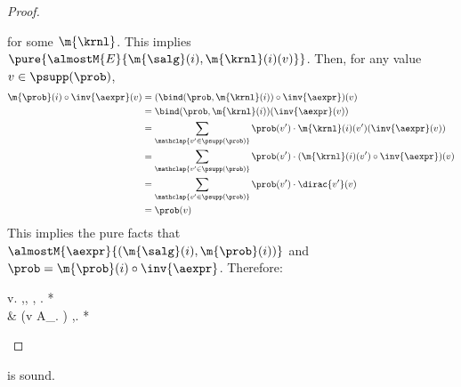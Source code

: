 \documentclass[acmsmall,nonacm,screen,appendix]{acmart}
\begin{document}
\begin{proof}
\begin{casesplit}
for some $\m{\krnl}$.
    This implies
    $\pure{\almostM{E}{\m{\salg}(i), \m{\krnl}(i)(v)}}$.
    Then, for any value $v \in \psupp(\prob)$,
    \begin{align*}
      \m{\prob}(i) \circ \inv{\aexpr}(v)
      &=(\bind(\prob, \m{\krnl}(i) ) \circ \inv{\aexpr})(v)\\
      &=  \bind(\prob, \m{\krnl}(i) )  (\inv{\aexpr}(v)) \\
      &=  \sum_{\mathclap{v'\in\psupp(\prob)}}  \prob(v') \cdot \m{\krnl}(i)(v') (\inv{\aexpr}(v)) \\
      &=  \sum_{\mathclap{v'\in\psupp(\prob)}}  \prob(v') \cdot (\m{\krnl}(i)(v') \circ \inv{\aexpr}) (v) \\
      &=  \sum_{\mathclap{v'\in\psupp(\prob)}}  \prob(v') \cdot \dirac{v'} (v) \\
&=  \prob(v)
    \end{align*}
    This implies the pure facts that
    $ \almostM{\aexpr}{(\m{\salg}(i),\m{\prob}(i))}$ and
    $\prob = \m{\prob}(i) \circ \inv{\aexpr}$.
    Therefore:
    \begin{eqexplain}
      \CC\prob v.  \notag
      \whichproves*
      \E \m{\salg},\m{\prob}, \m{\krnl}, \m{\permap}.
          \Own{\m{\salg},\m{\prob}, \m{\permap}} *
           \notag \\
          & \qquad \qquad  *
          (\forall v \in A_{\prob}.
          \wand
          )
      \whichproves
      \E \m{\salg},\m{\prob}.
        \Own{\m{\salg},\m{\prob}} *
            \ast
       \whichproves
       \qedhere
    \end{eqexplain}
  \end{casesplit}
\end{proof}
 \begin{lemma}
\label{proof:c-assoc}
   is sound.
\end{lemma}
\end{document}
